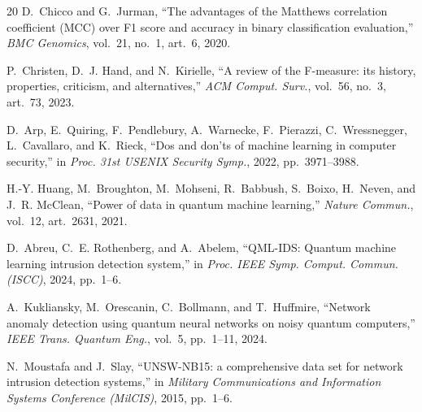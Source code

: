\documentclass[journal]{IEEEtran}
\begin{document}
\begin{thebibliography}{20}
D.~Chicco and G.~Jurman, ``The advantages of the Matthews correlation
coefficient (MCC) over F1 score and accuracy in binary classification
evaluation,'' \emph{BMC Genomics}, vol.~21, no.~1, art.~6, 2020.

P.~Christen, D.~J. Hand, and N.~Kirielle, ``A review of the F-measure: its
history, properties, criticism, and alternatives,'' \emph{ACM Comput.
Surv.}, vol.~56, no.~3, art.~73, 2023.

D.~Arp, E.~Quiring, F.~Pendlebury, A.~Warnecke, F.~Pierazzi,
C.~Wressnegger, L.~Cavallaro, and K.~Rieck, ``Dos and don'ts of machine
learning in computer security,'' in \emph{Proc. 31st USENIX Security
Symp.}, 2022, pp.~3971--3988.

H.-Y. Huang, M.~Broughton, M.~Mohseni, R.~Babbush, S.~Boixo, H.~Neven, and
J.~R. McClean, ``Power of data in quantum machine learning,'' \emph{Nature
Commun.}, vol.~12, art.~2631, 2021.

D.~Abreu, C.~E. Rothenberg, and A.~Abelem, ``QML-IDS: Quantum machine
learning intrusion detection system,'' in \emph{Proc. IEEE Symp. Comput.
Commun. (ISCC)}, 2024, pp.~1--6.

A.~Kukliansky, M.~Orescanin, C.~Bollmann, and T.~Huffmire, ``Network
anomaly detection using quantum neural networks on noisy quantum
computers,'' \emph{IEEE Trans. Quantum Eng.}, vol.~5, pp.~1--11, 2024.

N.~Moustafa and J.~Slay,
``UNSW-NB15: a comprehensive data set for network intrusion detection
  systems,'' in \emph{Military Communications and Information Systems
  Conference (MilCIS)}, 2015, pp.~1--6.

\end{thebibliography}

%
\end{document}
